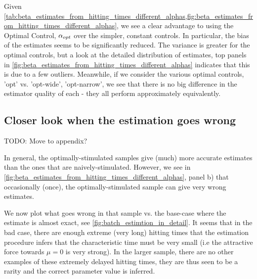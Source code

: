 \documentclass{article}
\begin{document}
Given
\cref{tab:beta_estimates_from_hitting_times_different_alphas,fig:beta_estimates_from_hitting_times_different_alphas},
we see a clear advantage to using the Optimal Control, ${\alpha}_{opt}$ over the
simpler, constant controls. In particular, the bias of the estimates seems to
be significantly reduced. The variance is greater for the optimal controls, but
a look at the detailed distribution of estimates, top panels in
\cref{fig:beta_estimates_from_hitting_times_different_alphas} indicates that
this is due to a few outliers. Meanwhile, if we consider the various optimal
controls, 'opt' vs. 'opt-wide', 'opt-narrow', we see that there is no big
difference in the estimator quality of each - they all perform approximately
equivalently. 


\subsection{Closer look when the estimation goes wrong}
TODO: Move to appendix?

In general, the optimally-stimulated samples give (much) more accurate estimates
than the ones that are naively-stimulated. However, we see in
\cref{fig:beta_estimates_from_hitting_times_different_alphas}, panel b) that
occasionally (once), the optimally-stimulated sample can give very wrong
estimates.

We now plot what goes wrong in that sample vs. the base-case where the estimate
is almost exact, see \cref{fig:batch_estimtion_in_detail}. It seems that in the
bad case, there are enough extreme (very long) hitting times that the estimation
procedure infers that the characteristic time must be very small (i.e the
attractive force towards $\mu=0$ is very strong). In the larger sample, there
are no other examples of these extremely delayed hitting times, they are thus
seen to be a rarity and the correct parameter value is inferred.
\end{document}
